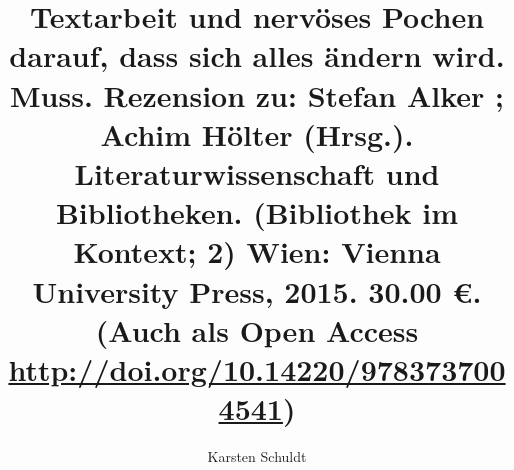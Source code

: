 

\fancyhead[R]{\thepage} %

\title{\LARGE{Textarbeit und nervöses Pochen darauf, dass sich alles ändern wird.
Muss. Rezension zu: Stefan Alker ; Achim Hölter (Hrsg.). Literaturwissenschaft
und Bibliotheken. (Bibliothek im Kontext; 2) Wien: Vienna University Press, 2015. 30.00 €. (Auch als Open Access \url{http://doi.org/10.14220/9783737004541})}} %
\author{Karsten Schuldt} %

\setcounter{page}{135}